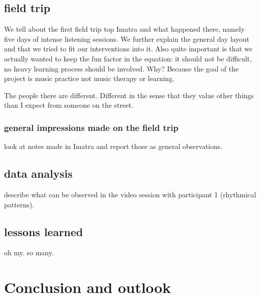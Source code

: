 \documentclass{acm_proc_article-sp}
\begin{document}

\subsection{field trip} %
\label{sub:field_trip}

We tell about the first field trip top Imatra and what happened there, namely five days of intense listening sessions.
We further explain the general day layout and that we tried to fit our interventions into it.
Also quite important is that we actually wanted to keep the fun factor in the equation: it should not be difficult, no heavy learning process should be involved. Why? Because the goal of the project is music practice not music therapy or learning.

The people there are different. Different in the sense that they value other things than I expect from someone on the street.



\subsubsection{general impressions made on the field trip} %
\label{ssub:general_impressions_made_on_the_field_trip}

look at notes made in Imatra and report those as general observations.


\subsection{data analysis} %
\label{sub:data_analysis}

describe what can be observed in the video session with participant 1 (rhythmical patterns).



\subsection{lessons learned} %
\label{sub:lessons_learned}

oh my. so many.





\section{Conclusion and outlook} %
\label{sec:conclusion_and_outlook}
\end{document}
